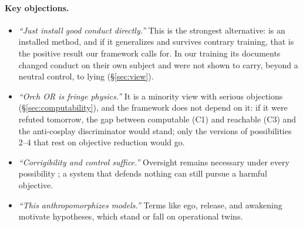 \documentclass[11pt]{article}
\begin{document}
\paragraph{Key objections.}
\begin{itemize}[leftmargin=*]
  \item \emph{``Just install good conduct directly.''} This is the strongest alternative: \citet{li2026msm} is an installed method, and if it generalizes and survives contrary training, that is the positive result our framework calls for. In our training its documents changed conduct on their own subject and were not shown to carry, beyond a neutral control, to lying (\S\ref{sec:view}).
  \item \emph{``Orch OR is fringe physics.''} It is a minority view with serious objections (\S\ref{sec:computability}), and the framework does not depend on it: if it were refuted tomorrow, the gap between computable (C1) and reachable (C3) and the anti-cosplay discriminator would stand; only the versions of possibilities 2--4 that rest on objective reduction would go.
  \item \emph{``Corrigibility and control suffice.''} Oversight remains necessary under every possibility \citep{soares2015corrigibility,hadfield2017offswitch}; a system that defends nothing can still pursue a harmful objective.
  \item \emph{``This anthropomorphizes models.''} Terms like ego, release, and awakening motivate hypotheses, which stand or fall on operational twins.
\end{itemize}
\end{document}

